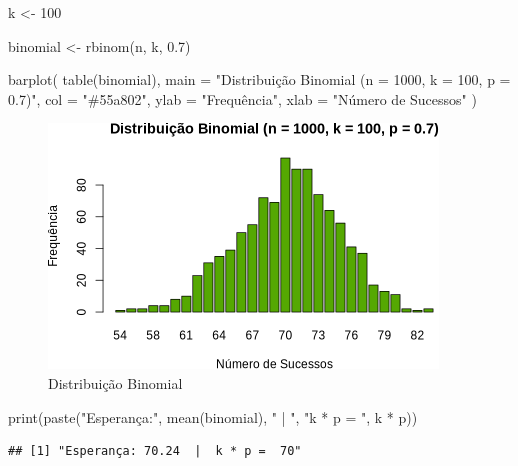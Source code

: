 \documentclass[
]{article}
\newenvironment{Shaded}{\begin{snugshade}}{\end{snugshade}}
\newcommand{\AttributeTok}[1]{\textcolor[rgb]{0.77,0.63,0.00}{#1}}
\newcommand{\DecValTok}[1]{\textcolor[rgb]{0.00,0.00,0.81}{#1}}
\newcommand{\FloatTok}[1]{\textcolor[rgb]{0.00,0.00,0.81}{#1}}
\newcommand{\FunctionTok}[1]{\textcolor[rgb]{0.00,0.00,0.00}{#1}}
\newcommand{\NormalTok}[1]{#1}
\newcommand{\OtherTok}[1]{\textcolor[rgb]{0.56,0.35,0.01}{#1}}
\newcommand{\SpecialCharTok}[1]{\textcolor[rgb]{0.00,0.00,0.00}{#1}}
\newcommand{\StringTok}[1]{\textcolor[rgb]{0.31,0.60,0.02}{#1}}
\begin{document}
\begin{Shaded}
\begin{Highlighting}[]
\NormalTok{k }\OtherTok{\textless{}{-}} \DecValTok{100}

\NormalTok{binomial }\OtherTok{\textless{}{-}} \FunctionTok{rbinom}\NormalTok{(n, k, }\FloatTok{0.7}\NormalTok{)}

\FunctionTok{barplot}\NormalTok{(}
  \FunctionTok{table}\NormalTok{(binomial),}
  \AttributeTok{main =} \StringTok{"Distribuição Binomial (n = 1000, k = 100, p = 0.7)"}\NormalTok{,}
  \AttributeTok{col =} \StringTok{"\#55a802"}\NormalTok{,}
  \AttributeTok{ylab =} \StringTok{"Frequência"}\NormalTok{,}
  \AttributeTok{xlab =} \StringTok{"Número de Sucessos"}
\NormalTok{)}
\end{Highlighting}
\end{Shaded}

\begin{figure}

{\centering \includegraphics{7_activity_files/figure-latex/binomial-plot-1} 

}

\caption{Distribuição Binomial}\label{fig:binomial-plot}
\end{figure}

\begin{Shaded}
\begin{Highlighting}[]
\FunctionTok{print}\NormalTok{(}\FunctionTok{paste}\NormalTok{(}\StringTok{"Esperança:"}\NormalTok{, }\FunctionTok{mean}\NormalTok{(binomial), }\StringTok{" | "}\NormalTok{, }\StringTok{"k * p = "}\NormalTok{, k }\SpecialCharTok{*}\NormalTok{ p))}
\end{Highlighting}
\end{Shaded}

\begin{verbatim}
## [1] "Esperança: 70.24  |  k * p =  70"
\end{verbatim}
\end{document}
